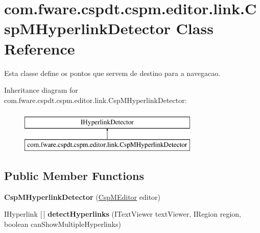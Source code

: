 \hypertarget{classcom_1_1fware_1_1cspdt_1_1cspm_1_1editor_1_1link_1_1_csp_m_hyperlink_detector}{}\section{com.\+fware.\+cspdt.\+cspm.\+editor.\+link.\+Csp\+M\+Hyperlink\+Detector Class Reference}
\label{classcom_1_1fware_1_1cspdt_1_1cspm_1_1editor_1_1link_1_1_csp_m_hyperlink_detector}


Esta classe define os pontos que servem de destino para a navegacao.  


Inheritance diagram for com.\+fware.\+cspdt.\+cspm.\+editor.\+link.\+Csp\+M\+Hyperlink\+Detector\+:\begin{figure}[H]
\begin{center}
\leavevmode
\includegraphics[height=2.000000cm]{classcom_1_1fware_1_1cspdt_1_1cspm_1_1editor_1_1link_1_1_csp_m_hyperlink_detector}
\end{center}
\end{figure}
\subsection*{Public Member Functions}
\begin{DoxyCompactItemize}
\item 
\mbox{\label{classcom_1_1fware_1_1cspdt_1_1cspm_1_1editor_1_1link_1_1_csp_m_hyperlink_detector_a54742efc01d322a7c1b440ebe5efddf9}} 
{\bfseries Csp\+M\+Hyperlink\+Detector} (\hyperlink{classcom_1_1fware_1_1cspdt_1_1cspm_1_1editor_1_1_csp_m_editor}{Csp\+M\+Editor} editor)
\item 
\mbox{\label{classcom_1_1fware_1_1cspdt_1_1cspm_1_1editor_1_1link_1_1_csp_m_hyperlink_detector_abec562c8f05836071f72e95c97e029de}} 
I\+Hyperlink \mbox{[}$\,$\mbox{]} {\bfseries detect\+Hyperlinks} (I\+Text\+Viewer text\+Viewer, I\+Region region, boolean can\+Show\+Multiple\+Hyperlinks)
\end{DoxyCompactItemize}


